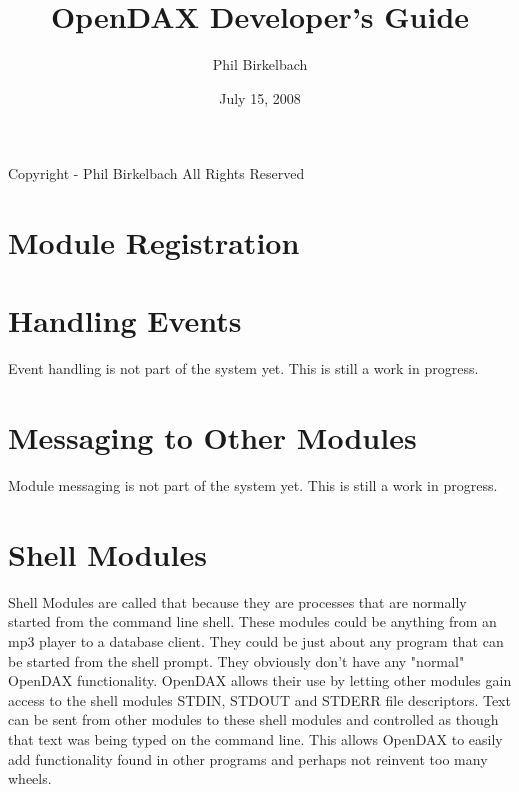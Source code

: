

\title{OpenDAX Developer's Guide}
\date{July 15, 2008}
\author{Phil Birkelbach}


\maketitle
\begin{flushleft}
Copyright  - Phil Birkelbach\linebreak
All Rights Reserved

\end{flushleft}

\tableofcontents
\newpage
{}




\chapter{Module Registration}



\chapter{Handling Events}

Event handling is not part of the system yet.  This is still a work in progress.

\chapter{Messaging to Other Modules}

Module messaging is not part of the system yet.  This is still a work in progress.

\chapter{Shell Modules}
Shell Modules are called that because they are processes that are normally started from the command line shell.  These modules could be anything from an mp3 player to a database client.  They could be just about any program that can be started from the shell prompt.  They obviously don't have any "normal" OpenDAX functionality.  OpenDAX allows their use by letting other modules gain access to the shell modules STDIN, STDOUT and STDERR file descriptors.  Text can be sent from other modules to these shell modules and controlled as though that text was being typed on the command line.  This allows OpenDAX to easily add functionality found in other programs and perhaps not reinvent too many wheels.

